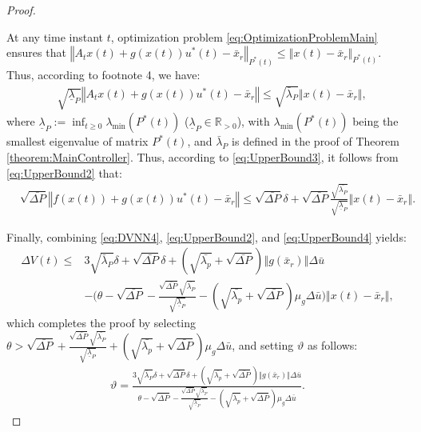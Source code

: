 \documentclass[1p,times]{elsarticle}
\begin{document}
\begin{proof}
\begin{itemize}
At any time instant $t$, optimization problem \eqref{eq:OptimizationProblemMain} ensures that $\left\Vert A_tx(t)+g\left(x(t)\right)u^\ast(t)-\bar{x}_r\right\Vert_{P^{\ast}(t)}\leq\left\Vert x(t)-\bar{x}_r\right\Vert_{P^{\ast}(t)}$. Thus, according to footnote 4, we have:
\begin{align}               &\sqrt{\underline{\lambda}_P}\left\Vert A_tx(t)+g\left(x(t)\right)u^\ast(t)-\bar{x}_r\right\Vert\leq\sqrt{\bar{\lambda}_P}\left\Vert x(t)-\bar{x}_r\right\Vert,\label{eq:UpperBound3}
\end{align} 
where $\underline{\lambda}_P:=\inf_{t\geq0}\lambda_{\text{min}}\left(P^\ast(t)\right)$ ($\underline{\lambda}_P\in\mathbb{R}_{>0}$), with  $\lambda_{\text{min}}\left(P^\ast(t)\right)$ being the smallest eigenvalue of matrix $P^\ast(t)$, and $\bar{\lambda}_P$ is defined in the proof of Theorem \ref{theorem:MainController}. Thus, according to \eqref{eq:UpperBound3}, it follows from \eqref{eq:UpperBound2} that:
\begin{align}
&\sqrt{\bar{\Delta{P}}}\left\Vert f\left(x(t)\right)+g\left(x(t)\right)u^\ast(t)-\bar{x}_r\right\Vert\leq\sqrt{\bar{\Delta{P}}}\delta+\sqrt{\bar{\Delta{P}}}\frac{\sqrt{\bar{\lambda_P}}}{\sqrt{\underline{\lambda}_P}}\left\Vert x(t)-\bar{x}_r\right\Vert.\label{eq:UpperBound4}
\end{align}
\end{itemize}


Finally, combining \eqref{eq:DVNN4}, \eqref{eq:UpperBound2}, and \eqref{eq:UpperBound4} yields:
\begin{align}               
\Delta{V(t)}\leq&{3\sqrt{\bar{\lambda}_P}\delta}+\sqrt{\bar{\Delta{P}}}\delta+(\sqrt{\bar{\lambda_p}}+\sqrt{\bar{\Delta{P}}})\left\Vert g(\bar{x}_r)\right\Vert\Delta\bar{u}\nonumber\\
&-\Bigg(\theta-\sqrt{\bar{\Delta{P}}}-\frac{\sqrt{\bar{\Delta{P}}}\sqrt{\bar{\lambda_P}}}{\sqrt{\underline{\lambda}_P}}-(\sqrt{\bar{\lambda_p}}+\sqrt{\bar{\Delta{P}}})\mu_g\Delta\bar{u}\Bigg)\left\Vert x(t)-\bar{x}_r\right\Vert,
\end{align}
which completes the proof by selecting $\theta>\sqrt{\bar{\Delta{P}}}+\frac{\sqrt{\bar{\Delta{P}}}\sqrt{\bar{\lambda_P}}}{\sqrt{\underline{\lambda}_P}}+(\sqrt{\bar{\lambda_p}}+\sqrt{\bar{\Delta{P}}})\mu_g\Delta\bar{u}$, and setting $\vartheta$ as follows:
\begin{align}\label{eq:vartheta}
\vartheta=\frac{{3\sqrt{\bar{\lambda}_P}\delta}+\sqrt{\bar{\Delta{P}}}\delta+(\sqrt{\bar{\lambda_p}}+\sqrt{\bar{\Delta{P}}})\left\Vert g(\bar{x}_r)\right\Vert\Delta\bar{u}}{\theta-\sqrt{\bar{\Delta{P}}}-\frac{\sqrt{\bar{\Delta{P}}}\sqrt{\bar{\lambda_P}}}{\sqrt{\underline{\lambda}_P}}-(\sqrt{\bar{\lambda_p}}+\sqrt{\bar{\Delta{P}}})\mu_g\Delta\bar{u}}.
\end{align}
\end{proof}
\end{document}

